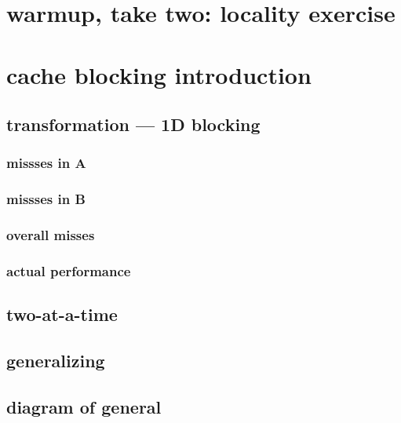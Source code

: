 \section{warmup, take two: locality exercise}


\section{cache blocking introduction}
%
\subsection{transformation --- 1D blocking}

\subsubsection{missses in A}

\subsubsection{missses in B}

\subsubsection{overall misses}

\subsubsection{actual performance}


\subsection{two-at-a-time}

%

\subsection{generalizing}


\subsection{diagram of general}


